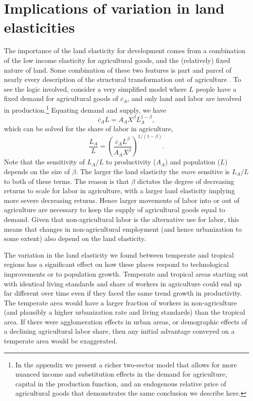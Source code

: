 \documentclass[11pt]{article}
\begin{document}
\section{Implications of variation in land elasticities}\label{SEC_implications}
The importance of the land elasticity for development comes from a combination of the low income elasticity for agricultural goods, and the (relatively) fixed nature of land. Some combination of these two features is part and parcel of nearly every description of the structural transformation out of agriculture \citep{kp2001,Gollin:2007oq,Restuccia:2008hc,Gollin:2010ys,vollrath2011,Alvarez-Cuadrado:2011nx,hrv2014,duarte2010role}. To see the logic involved, consider a very simplified model where $L$ people have a fixed demand for agricultural goods of $\overline{c}_A$, and only land and labor are involved in production.\footnote{In the appendix we present a richer two-sector model that allows for more nuanced income and substitution effects in the demand for agriculture, capital in the production function, and an endogenous relative price of agricultural goods that demonstrates the same conclusion we describe here.} Equating demand and supply, we have
\begin{equation}
	\overline{c}_A L = A_A X^{\beta} L_A^{1-\beta},
\end{equation}
which can be solved for the share of labor in agriculture,
\begin{equation}
	\frac{L_A}{L} = \left(\frac{\overline{c}_A L^{\beta}}{A_A X^{\beta}}\right)^{1/(1-\beta)}.
\end{equation}
Note that the sensitivity of $L_A/L$ to productivity ($A_A$) and population ($L$) depends on the size of $\beta$. The larger the land elasticity the \textit{more} sensitive is $L_A/L$ to both of these terms. The reason is that $\beta$ dictates the degree of decreasing returns to scale for labor in agriculture, with a larger land elasticity implying more severe decreasing returns. Hence larger movements of labor into or out of agriculture are necessary to keep the supply of agricultural goods equal to demand. Given that non-agricultural labor is the alternative use for labor, this means that changes in non-agricultural employment (and hence urbanization to some extent) also depend on the land elasticity. 

The variation in the land elasticity we found between temperate and tropical regions has a significant effect on how these places respond to technological improvements or to population growth. Temperate and tropical areas starting out with identical living standards and share of workers in agriculture could end up far different over time even if they faced the same trend growth in productivity. The temperate area would have a larger fraction of workers in non-agriculture (and plausibly a higher urbanization rate and living standards) than the tropical area. If there were agglomeration effects in urban areas, or demographic effects of a declining agricultural labor share, then any initial advantage conveyed on a temperate area would be exaggerated.
\end{document}

